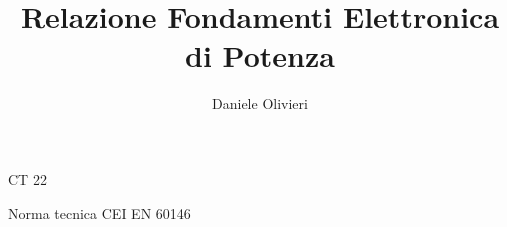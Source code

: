\documentclass[a4paper,10pt]{article}
\title{Relazione Fondamenti Elettronica di Potenza}
\author{Daniele Olivieri}
\date{}
\begin{document}
\maketitle

CT 22

Norma tecnica CEI EN 60146
\end{document}
